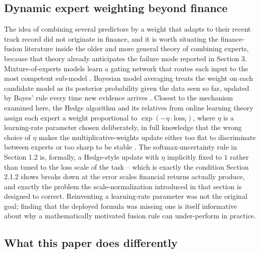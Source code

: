 \documentclass[10pt,a4paper,twocolumn]{article}
\begin{document}
\subsection{Dynamic expert weighting beyond finance}

The idea of combining several predictors by a weight that adapts to their recent track record did not originate in finance, and it is worth situating the finance-fusion literature inside the older and more general theory of combining experts, because that theory already anticipates the failure mode reported in Section 3. Mixture-of-experts models learn a gating network that routes each input to the most competent sub-model \cite{jacobs1991}. Bayesian model averaging treats the weight on each candidate model as its posterior probability given the data seen so far, updated by Bayes' rule every time new evidence arrives \cite{hoeting1999}. Closest to the mechanism examined here, the Hedge algorithm and its relatives from online learning theory assign each expert a weight proportional to $\exp(-\eta \cdot \text{loss}_i)$, where $\eta$ is a learning-rate parameter chosen deliberately, in full knowledge that the wrong choice of $\eta$ makes the multiplicative-weights update either too flat to discriminate between experts or too sharp to be stable \cite{freundschapire1997,cesabianchi2006}. The softmax-uncertainty rule in Section 1.2 is, formally, a Hedge-style update with $\eta$ implicitly fixed to $1$ rather than tuned to the loss scale of the task -- which is exactly the condition Section 2.1.2 shows breaks down at the error scales financial returns actually produce, and exactly the problem the scale-normalization introduced in that section is designed to correct. Reinventing a learning-rate parameter was not the original goal; finding that the deployed formula was missing one is itself informative about why a mathematically motivated fusion rule can under-perform in practice.

\subsection{What this paper does differently}
\end{document}
